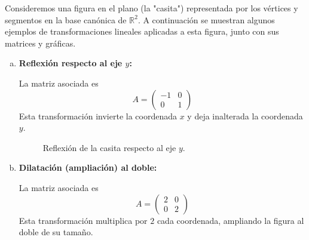 \begin{example}
Consideremos una figura en el plano (la "casita") representada por los vértices y segmentos en la base canónica de $\mathbb{R}^2$. A continuación se muestran algunos ejemplos de transformaciones lineales aplicadas a esta figura, junto con sus matrices y gráficas.

\begin{enumerate}[(a)]
    \item \textbf{Reflexión respecto al eje $y$:}

    La matriz asociada es
    \[
    A = \begin{pmatrix} -1 & 0 \\ 0 & 1 \end{pmatrix}
    \]
    Esta transformación invierte la coordenada $x$ y deja inalterada la coordenada $y$.

    \begin{figure}[H]\centering
    \caption{Reflexión de la casita respecto al eje $y$.}
    \end{figure}

    \item \textbf{Dilatación (ampliación) al doble:}

    La matriz asociada es
    \[
    A = \begin{pmatrix} 2 & 0 \\ 0 & 2 \end{pmatrix}
    \]
    Esta transformación multiplica por $2$ cada coordenada, ampliando la figura al doble de su tamaño.


\end{enumerate}
\end{example}

